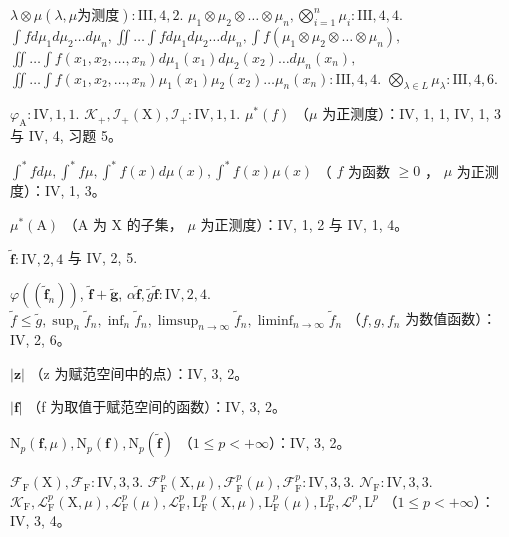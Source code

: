\(\lambda \otimes \mu (\lambda ,\mu \text{为测度}):\mathrm{III},4,2.\) \(\mu_1\otimes \mu_2\otimes \dots \otimes \mu_n,\bigotimes_{i = 1}^n\mu_i:\mathrm{III},4,4.\) \(\int f d\mu_1d\mu_2\dots d\mu_n,\iint \dots \int f d\mu_1d\mu_2\dots d\mu_n,\int f(\mu_1\otimes \mu_2\otimes \dots \otimes \mu_n),\) \(\iint \dots \int f(x_1,x_2,\ldots ,x_n)d\mu_1(x_1)d\mu_2(x_2)\dots d\mu_n(x_n),\) \(\iint \dots \int f(x_1,x_2,\ldots ,x_n)\mu_1(x_1)\mu_2(x_2)\dots \mu_n(x_n):\mathrm{III},4,4.\) \(\bigotimes_{\lambda \in L}\mu_{\lambda}:\mathrm{III},4,6.\)

\(\varphi_{\mathrm{A}}:\mathrm{IV},1,1.\) \(\mathcal{K}_{+},\mathcal{I}_{+}(\mathrm{X}),\mathcal{I}_{+}:\mathrm{IV},1,1.\) \(\mu^{*}(f)\) （\(\mu\) 为正测度）：IV, 1, 1, IV, 1, 3 与 IV, 4, 习题 5。

\(\int^{*}fd\mu,\int^{*}f\mu,\int^{*}f(x)d\mu(x),\int^{*}f(x)\mu(x)\) （ \(f\) 为函数 \(\geqslant 0\) ， \(\mu\) 为正测度）：IV, 1, 3。

\(\mu^{*}(\mathrm{A})\) （A 为 X 的子集， \(\mu\) 为正测度）：IV, 1, 2 与 IV, 1, 4。

\(\widetilde{\mathbf{f}}:\mathrm{IV},2,4\) 与 IV, 2, 5.

\(\varphi((\widetilde{\mathbf{f}}_n))\), \(\widetilde{\mathbf{f}} +\widetilde{\mathbf{g}}\), \(\alpha \widetilde{\mathbf{f}},\widetilde{g}\widetilde{\mathbf{f}}:\mathrm{IV},2,4.\) \(\widetilde{f}\leqslant \widetilde{g},\sup_{n}\widetilde{f}_n,\inf_n\widetilde{f}_n,\limsup_{n\to \infty}\widetilde{f}_n,\liminf_{n\to \infty}\widetilde{f}_n\) （\(f,g,f_n\) 为数值函数）：IV, 2, 6。

\(|\mathbf{z}|\) （z 为赋范空间中的点）：IV, 3, 2。

\(|\mathbf{f}|\) （f 为取值于赋范空间的函数）：IV, 3, 2。

\(\mathrm{N}_p(\mathbf{f},\mu),\mathrm{N}_p(\mathbf{f}),\mathrm{N}_p(\widetilde{\mathbf{f}})\) （\(1\leqslant p<+\infty\)）：IV, 3, 2。

\(\mathcal{F}_{\mathrm{F}}(\mathrm{X}),\mathcal{F}_{\mathrm{F}}:\mathrm{IV},3,3.\) \(\mathcal{F}_{\mathrm{F}}^{p}(\mathrm{X},\mu),\mathcal{F}_{\mathrm{F}}^{p}(\mu),\mathcal{F}_{\mathrm{F}}^{p}:\mathrm{IV},3,3.\) \(\mathcal{N}_{\mathrm{F}}:\mathrm{IV},3,3.\) \(\mathcal{K}_{\mathrm{F}},\mathcal{L}_{\mathrm{F}}^{p}(\mathrm{X},\mu),\mathcal{L}_{\mathrm{F}}^{p}(\mu),\mathcal{L}_{\mathrm{F}}^{p},\mathrm{L}_{\mathrm{F}}^{p}(\mathrm{X},\mu),\mathrm{L}_{\mathrm{F}}^{p}(\mu),\mathrm{L}_{\mathrm{F}}^{p},\mathcal{L}^{p},\mathrm{L}^{p}\) （\(1\leqslant p<+\infty\)）：IV, 3, 4。

